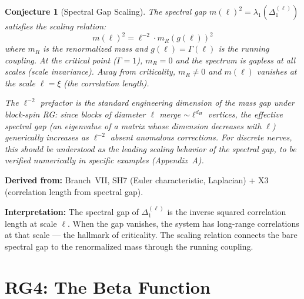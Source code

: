\documentclass[11pt,letterpaper]{article}
\newtheorem{conjecture}{Conjecture}[section]
\begin{document}
\begin{conjecture}[Spectral Gap Scaling]\label{conj:spectral_gap}
The spectral gap $m(\ell)^2 = \lambda_1(\Delta_1^{(\ell)})$ 
satisfies the scaling relation:
\begin{equation}\label{eq:spectral_scaling}
    m(\ell)^2 = \ell^{-2} \cdot m_R(g(\ell))^2
\end{equation}
where $m_R$ is the \emph{renormalized mass} and $g(\ell) = 
\Gamma(\ell)$ is the running coupling. At the critical point 
($\Gamma = 1$), $m_R = 0$ and the spectrum is gapless at all 
scales (scale invariance). Away from criticality, 
$m_R \neq 0$ and $m(\ell)$ vanishes at the scale $\ell = \xi$ 
(the correlation length).

The $\ell^{-2}$ prefactor is the standard engineering dimension 
of the mass gap under block-spin RG: since blocks of diameter 
$\ell$ merge $\sim\!\ell^{d_H}$ vertices, the effective spectral 
gap (an eigenvalue of a matrix whose dimension decreases with 
$\ell$) generically increases as $\ell^{-2}$ absent anomalous 
corrections. For discrete nerves, this should be understood as 
the leading scaling behavior of the spectral gap, to be verified 
numerically in specific examples (Appendix~A).
\end{conjecture}

\textbf{Derived from:} Branch~VII, SH7 (Euler characteristic, 
Laplacian) + X3 (correlation length from spectral gap).

\textbf{Interpretation:} The spectral gap of $\Delta_1^{(\ell)}$ 
is the inverse squared correlation length at scale $\ell$. When 
the gap vanishes, the system has long-range correlations at that 
scale --- the hallmark of criticality. The scaling relation 
connects the bare spectral gap to the renormalized mass through 
the running coupling.

\section{RG4: The Beta Function}
\end{document}
